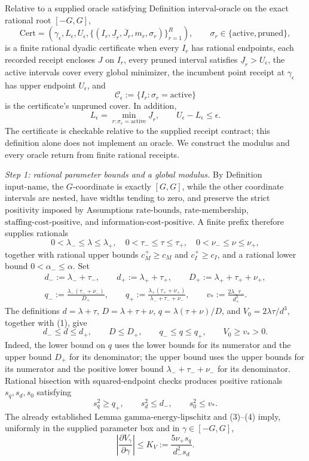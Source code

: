 Relative to a supplied oracle satisfying Definition \(\mathrm{interval\mbox{-}oracle}\) on the exact rational root \([-G,G]\),
\[
 \mathrm{Cert}=(\gamma_\epsilon,L_\epsilon,U_\epsilon,
 \{(I_r,\underline J_r,\overline J_r,m_r,\sigma_r)\}_{r=1}^R),
 \qquad \sigma_r\in\{\mathrm{active},\mathrm{pruned}\},
\]
is a finite rational dyadic certificate when every \(I_r\) has rational endpoints, each recorded receipt encloses \(J\) on \(I_r\), every pruned interval satisfies \(\underline J_r>U_\epsilon\), the active intervals cover every global minimizer, the incumbent point receipt at \(\gamma_\epsilon\) has upper endpoint \(U_\epsilon\), and
\[
 \mathcal C_\epsilon:=\{I_r:\sigma_r=\mathrm{active}\}
\]
is the certificate's unpruned cover.  In addition,
\[
 L_\epsilon=\min_{r:\sigma_r=\mathrm{active}}\underline J_r,
 \qquad U_\epsilon-L_\epsilon\leq\epsilon.
\]
The certificate is checkable relative to the supplied receipt contract; this definition alone does not implement an oracle.
We construct the modulus and every oracle return from finite rational receipts.

\emph{Step 1: rational parameter bounds and a global modulus.}
By Definition \(\mathrm{input\mbox{-}name}\), the \(G\)-coordinate is exactly \([G,G]\), while the other coordinate intervals are nested, have widths tending to zero, and preserve the strict positivity imposed by Assumptions \(\mathrm{rate\mbox{-}bounds}\), \(\mathrm{rate\mbox{-}membership}\), \(\mathrm{staffing\mbox{-}cost\mbox{-}positive}\), and \(\mathrm{information\mbox{-}cost\mbox{-}positive}\).  A finite prefix therefore supplies rationals
\[
 0<\lambda_-\leq\lambda\leq\lambda_+,
 \quad 0<\tau_-\leq\tau\leq\tau_+,
 \quad 0<\nu_-\leq\nu\leq\nu_+,
\tag{1}
\]
together with rational upper bounds \(c_M^+\geq c_M\) and \(c_I^+\geq c_I\), and a rational lower bound \(0<\alpha_-\leq\alpha\).  Set
\[
 \begin{gathered}
 d_-:=\lambda_-+\tau_-,\qquad d_+:=\lambda_++\tau_+,
 \qquad D_+:=\lambda_++\tau_++\nu_+,\\
 q_-:=\frac{\lambda_-(\tau_-+\nu_-)}{D_+},\qquad
 q_+:=\frac{\lambda_+(\tau_++\nu_+)}{\lambda_-+\tau_-+\nu_-},
 \qquad v_*:=\frac{2\lambda_-\tau_-}{d_+^3}.
 \end{gathered}
\tag{2}
\]
The definitions \(d=\lambda+\tau\), \(D=\lambda+\tau+\nu\), \(q=\lambda(\tau+\nu)/D\), and \(V_0=2\lambda\tau/d^3\), together with (1), give
\[
 d_-\leq d\leq d_+,
 \qquad D\leq D_+,
 \qquad q_-\leq q\leq q_+,
 \qquad V_0\geq v_*>0.
\tag{3}
\]
Indeed, the lower bound on \(q\) uses the lower bounds for its numerator and the upper bound \(D_+\) for its denominator; the upper bound uses the upper bounds for its numerator and the positive lower bound \(\lambda_-+\tau_-+\nu_-\) for its denominator.  Rational bisection with squared-endpoint checks produces positive rationals \(s_q,s_d,s_0\) satisfying
\[
 s_q^2\geq q_+,
 \qquad s_d^2\leq d_-,
 \qquad s_0^2\leq v_*.
\tag{4}
\]
The already established Lemma \(\mathrm{gamma\mbox{-}energy\mbox{-}lipschitz}\) and (3)--(4) imply, uniformly in the supplied parameter box and in \(\gamma\in[-G,G]\),
\[
 \left|\frac{\partial V_\gamma}{\partial\gamma}\right|
 \leq K_V:=\frac{5\nu_+s_q}{d_-^2s_d}.
\tag{5}
\]

